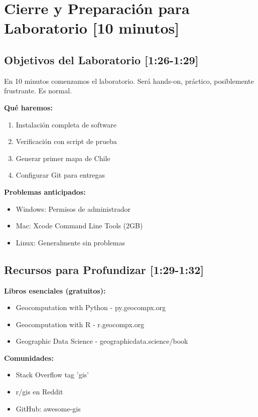 \documentclass[11pt,a4paper]{article}
\newcommand{\tiempo}[1]{\textcolor{timecolor}{\textbf{[#1]}}}
\newcommand{\decir}[1]{\begin{tcolorbox}[colback=blue!5,colframe=usachblue,title={DECIR}]#1\end{tcolorbox}}
\begin{document}
\newpage

\section{Cierre y Preparación para Laboratorio \tiempo{10 minutos}}

\subsection{Objetivos del Laboratorio \tiempo{1:26-1:29}}

\decir{En 10 minutos comenzamos el laboratorio. Será hands-on, práctico, posiblemente frustrante. Es normal.}

\textbf{Qué haremos:}
\begin{enumerate}
    \item Instalación completa de software
    \item Verificación con script de prueba
    \item Generar primer mapa de Chile
    \item Configurar Git para entregas
\end{enumerate}

\textbf{Problemas anticipados:}
\begin{itemize}
    \item Windows: Permisos de administrador
    \item Mac: Xcode Command Line Tools (2GB)
    \item Linux: Generalmente sin problemas
\end{itemize}

\subsection{Recursos para Profundizar \tiempo{1:29-1:32}}

\textbf{Libros esenciales (gratuitos):}
\begin{itemize}
    \item Geocomputation with Python - py.geocompx.org
    \item Geocomputation with R - r.geocompx.org
    \item Geographic Data Science - geographicdata.science/book
\end{itemize}

\textbf{Comunidades:}
\begin{itemize}
    \item Stack Overflow tag 'gis'
    \item r/gis en Reddit
    \item GitHub: awesome-gis
\end{itemize}
\end{document}
